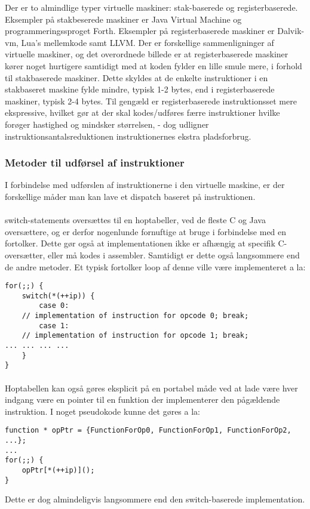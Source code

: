 Der er to almindlige typer virtuelle maskiner: stak-baserede og registerbaserede.
Eksempler på stakbeserede maskiner er Java Virtual Machine og programmeringssproget Forth. Eksempler på registerbaserede maskiner er Dalvik-vm, Lua's mellemkode samt LLVM.
Der er forskellige sammenligninger af virtuelle maskiner\cite{stackregister1,stackregister2}, og det overordnede billede er at registerbaserede maskiner kører noget hurtigere samtidigt med at koden fylder en lille smule mere, i forhold til stakbaserede maskiner. Dette skyldes at de enkelte instruktioner i en stakbaseret maskine fylde mindre, typisk 1-2 bytes, end i registerbaserede maskiner, typisk 2-4 bytes. Til gengæld er registerbaserede instruktionsset mere ekspressive, hvilket gør at der skal kodes/udføres færre instruktioner hvilke forøger hastighed og mindsker størrelsen, - dog udligner instruktions\-antals\-reduktionen instruktionernes ekstra pladsforbrug.

\subsubsection{Metoder til udførsel af instruktioner}
I forbindelse med udførslen af instruktionerne i den virtuelle maskine, er der forskellige måder man kan lave et dispatch baseret på instruktionen.

\paragraph{}
switch-statements oversættes til en hoptabeller, ved de fleste C og Java oversættere, og er derfor nogenlunde fornuftige at bruge i forbindelse med en fortolker. Dette gør også at implementationen ikke er afhængig at specifik C-oversætter, eller må kodes i assembler. Samtidigt er dette også langsommere end de andre metoder. Et typisk fortolker loop af denne ville være implementeret a la:
\begin{verbatim}
for(;;) {
    switch(*(++ip)) {
        case 0:
	// implementation of instruction for opcode 0; break;
        case 1:
	// implementation of instruction for opcode 1; break;
... ... ... ...
    }
}
\end{verbatim}

\paragraph{}
Hoptabellen kan også gøres eksplicit på en portabel måde ved at lade være hver indgang være en pointer til en funktion der implementerer den pågældende instruktion. I noget pseudokode kunne det gøres a la:
\begin{verbatim}
function * opPtr = {FunctionForOp0, FunctionForOp1, FunctionForOp2, ...};
...
for(;;) {
    opPtr[*(++ip)]();
}
\end{verbatim}
Dette er dog almindeligvis langsommere end den switch-baserede implementation.

